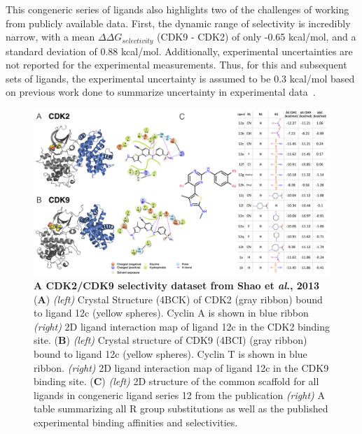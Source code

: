 \documentclass[phd,tocprelim]{cornell}
\begin{document}
This congeneric series of ligands also highlights two of the challenges of working from publicly available data. First, the dynamic range of selectivity is incredibly narrow, with a mean $\Delta \Delta G_{selectivity}$ (CDK9 - CDK2) of only -0.65 kcal/mol, and a standard deviation of 0.88 kcal/mol. Additionally, experimental uncertainties are not reported for the experimental measurements. Thus, for this and subsequent sets of ligands, the experimental uncertainty is assumed to be 0.3 kcal/mol based on previous work done to summarize uncertainty in experimental data~\citep{BROWN2009420,Hauser:2018vz}. 
\begin{landscape}
\begin{figure}[p]
\centering
	\includegraphics[width=1.0\linewidth]{figures/figure2.png}
	\caption[A CDK2/CDK9 selectivity dataset from Shao et \emph{al}., 2013]{{\bf A CDK2/CDK9 selectivity dataset from Shao et \emph{al}., 2013}
({\bf A})  \emph{(left)} Crystal Structure (4BCK)\citep{Hole2013-sr} of CDK2 (gray ribbon)  bound to ligand 12c (yellow spheres). Cyclin A is shown in blue ribbon \emph{(right)} 2D ligand interaction map of ligand 12c in the CDK2 binding site. 
({\bf B}) \emph{(left)} Crystal structure of CDK9 (4BCI)\citep{Hole2013-sr} (gray ribbon) bound to ligand 12c (yellow spheres). Cyclin T is shown in blue ribbon. \emph{(right)} 2D ligand interaction map of ligand 12c in the CDK9 binding site.
({\bf C}) \emph{(left)} 2D structure of the common scaffold for all ligands in congeneric ligand series 12 from the publication \emph{(right)} A table summarizing all R group substitutions as well as the published experimental binding affinities and selectivities\citep{Shao2013-oe}. 
	}
	\label{fig:figure-2}
\end{figure}
\end{landscape}
\end{document}
